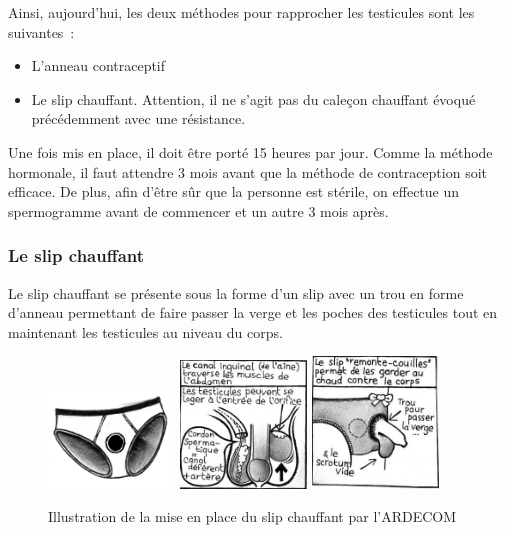 \documentclass[12pt,a4paper]{report}
\begin{document}
Ainsi, aujourd'hui, les deux méthodes pour rapprocher les testicules sont les suivantes :
\begin{itemize}
    \item L'anneau contraceptif
    \item Le slip chauffant. Attention, il ne s'agit pas du caleçon chauffant évoqué précédemment avec une résistance.
\end{itemize}

Une fois mis en place, il doit être porté 15 heures par jour. Comme la méthode hormonale, il faut attendre 3 mois avant que la méthode de contraception soit efficace. \cite{anne-sophiedelcourHommeSousPilule}
De plus, afin d'être sûr que la personne est stérile, on effectue un spermogramme avant de commencer et un autre 3 mois après. \cite{MethodeThermique}

\subsubsection{Le slip chauffant}

Le slip chauffant se présente sous la forme d'un slip avec un trou en forme d'anneau permettant de faire passer la verge et les poches des testicules tout en maintenant les testicules au niveau du corps. \cite{MethodeThermique}

\begin{figure}[h]
    \centering
    \includegraphics[width=0.3\textwidth]{images/scientiphique/slip_chauffant.png}
    \includegraphics[width=0.3\textwidth]{images/scientiphique/slip_chauffant_mise_en_place_1.png}
    \includegraphics[width=0.3\textwidth]{images/scientiphique/slip_chauffant_mise_en_place_2.png}
    \caption{Illustration de la mise en place du slip chauffant par l'ARDECOM \cite{MethodeThermique}}
    \label{fig:slip_chauffant}
\end{figure}
\end{document}
